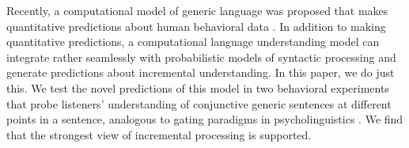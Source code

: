 \documentclass[10pt,letterpaper]{article}
\begin{document}
Recently, a computational model of generic language was proposed that makes quantitative predictions about human behavioral data \cite{Tessler2019:genLang}.
In addition to making quantitative predictions, a computational language understanding model can integrate rather seamlessly with probabilistic models of syntactic processing \cite{Levy2008} and generate predictions about incremental understanding.
In this paper, we do just this. 
We test the novel predictions of this model in two behavioral experiments that probe listeners' understanding of conjunctive generic sentences at different points in a sentence, analogous to gating paradigms in psycholinguistics \cite{Grosjean1980}.
We find that the strongest view of incremental processing is supported.
 




\end{document}
